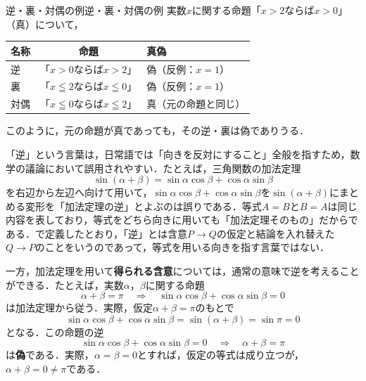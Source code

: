 \begin{example}{逆・裏・対偶の例}{逆・裏・対偶の例}
  実数$x$に関する命題「$x > 2$ならば$x > 0$」（真）について，
  \begin{center}
    \begin{tabular}{|l|c|l|} \hline
      名称 & 命題                                  & 真偽                 \\ \hline
      逆   & 「$x > 0$ならば$x > 2$」              & 偽（反例：$x = 1$）  \\ \hline
      裏   & 「$x \leqq 2$ならば$x \leqq 0$」      & 偽（反例：$x = 1$）  \\ \hline
      対偶 & 「$x \leqq 0$ならば$x \leqq 2$」      & 真（元の命題と同じ） \\ \hline
    \end{tabular}
  \end{center}
  このように，元の命題が真であっても，その逆・裏は偽でありうる．
\end{example}

\begin{remark}[「逆」の誤用に注意]
  「逆」という言葉は，日常語では「向きを反対にすること」全般を指すため，数学の議論において誤用されやすい．たとえば，三角関数の加法定理
  \[
    \sin (\alpha + \beta) = \sin \alpha \cos \beta + \cos \alpha \sin \beta
  \]
  を右辺から左辺へ向けて用いて，$\sin \alpha \cos \beta + \cos \alpha \sin \beta$を$\sin (\alpha + \beta)$にまとめる変形を「加法定理の逆」とよぶのは誤りである．等式$A = B$と$B = A$は同じ内容を表しており，等式をどちら向きに用いても「加法定理そのもの」だからである．で定義したとおり，「逆」とは含意$P \to Q$の仮定と結論を入れ替えた$Q \to P$のことをいうのであって，等式を用いる向きを指す言葉ではない．

  一方，加法定理を用いて\textbf{得られる含意}については，通常の意味で逆を考えることができる．たとえば，実数$\alpha$，$\beta$に関する命題
  \[
    \alpha + \beta = \pi
    \quad \Longrightarrow \quad
    \sin \alpha \cos \beta + \cos \alpha \sin \beta = 0
  \]
  は加法定理から従う．実際，仮定$\alpha + \beta = \pi$のもとで
  \[
    \sin \alpha \cos \beta + \cos \alpha \sin \beta
    = \sin (\alpha + \beta)
    = \sin \pi
    = 0
  \]
  となる．この命題の逆
  \[
    \sin \alpha \cos \beta + \cos \alpha \sin \beta = 0
    \quad \Longrightarrow \quad
    \alpha + \beta = \pi
  \]
  は\textbf{偽}である．実際，$\alpha = \beta = 0$とすれば，仮定の等式は成り立つが，$\alpha + \beta = 0 \ne \pi$である．
\end{remark}


